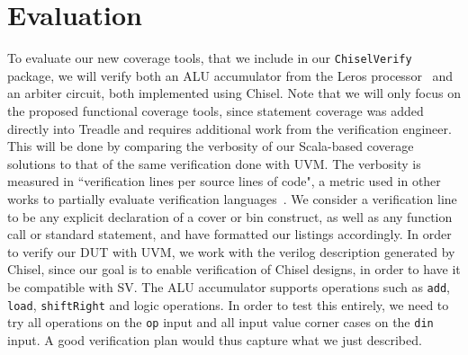 \documentclass[a4paper]{IEEEtran}
\newcommand{\todo}[1]{{\color{olive} TODO: #1}}
\newcommand{\martin}[1]{{\color{blue} Martin: #1}}
\newcommand{\hjd}[1]{{\color{pink} Hans: #1}}
\begin{document}
\section{Evaluation}
To evaluate our new coverage tools, that we include in our \texttt{ChiselVerify} package, we will verify both an ALU accumulator from the Leros processor~\cite{leros:arcs2019} and an arbiter circuit, both implemented using Chisel.
Note that we will only focus on the proposed functional coverage tools, since statement coverage  was added directly into Treadle and requires additional work from the verification engineer.
This will be done by comparing the verbosity of our Scala-based coverage solutions to that of the same verification done with UVM. 
The verbosity is measured in ``verification lines per source lines of code", a metric used in other works to partially evaluate verification languages~\cite{Nagini:2018, MuellerSchwerhoffSummers16}.
We consider a verification line to be any explicit declaration of a cover or bin construct, as well as any function call or standard statement, and have formatted our listings accordingly. 
In order to verify our DUT with UVM, we work with the verilog description generated by Chisel, since our goal is to enable verification of Chisel designs, in order to have it be compatible with SV.
The ALU accumulator supports operations such as \texttt{add}, \texttt{load}, \texttt{shiftRight} and logic operations. %
In order to test this entirely, we need to try all operations on the \texttt{op} input and all input value corner cases on the \texttt{din} input. %
A good verification plan would thus capture what we just described. 
\end{document}

